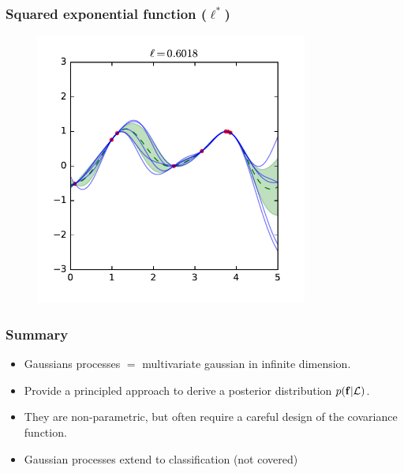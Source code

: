 \documentclass{beamer}
\begin{document}
\begin{frame}
    \frametitle{Squared exponential function ($\ell^*$)}

    \begin{figure}
        \centering
        \includegraphics[width=0.8\textwidth]{./figures/rbf-ml.pdf}
    \end{figure}
\end{frame}

\begin{frame}
    \frametitle{Summary}

    \begin{itemize}
        \item Gaussians processes $=$ multivariate gaussian in infinite dimension.
        \item Provide a principled approach to derive a posterior distribution $p(\mathbf{f}|{\cal L})$.
        \item They are non-parametric, but often require a careful design of the covariance function.
        \item Gaussian processes extend to classification (not covered)
    \end{itemize}
\end{frame}
\end{document}

